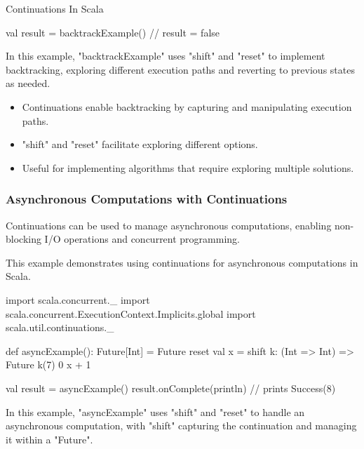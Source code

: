 \begin{notes}{Continuations In Scala}
\begin{highlight}
\begin{code}[Scala]
    val result = backtrackExample()  // result = false
    \end{code}
    
        In this example, "backtrackExample" uses "shift" and "reset" to implement backtracking, exploring different execution paths and reverting to previous states as needed.
    
        \begin{itemize}
            \item Continuations enable backtracking by capturing and manipulating execution paths.
            \item "shift" and "reset" facilitate exploring different options.
            \item Useful for implementing algorithms that require exploring multiple solutions.
        \end{itemize}
    
    \end{highlight}
    
    \subsubsection*{Asynchronous Computations with Continuations}
    
    Continuations can be used to manage asynchronous computations, enabling non-blocking I/O operations and concurrent programming.
    
    \begin{highlight}
    
        This example demonstrates using continuations for asynchronous computations in Scala.
    
    \begin{code}[Scala]
    import scala.concurrent._
    import scala.concurrent.ExecutionContext.Implicits.global
    import scala.util.continuations._
    
    def asyncExample(): Future[Int] = Future {
        reset {
            val x = shift { k: (Int => Int) =>
                Future {
                    k(7)
                }
                0
            }
            x + 1
        }
    }
    
    val result = asyncExample()
    result.onComplete(println)  // prints Success(8)
    \end{code}
    
        In this example, "asyncExample" uses "shift" and "reset" to handle an asynchronous computation, with "shift" capturing the continuation and managing it within a "Future".
    

\end{highlight}
\end{notes}
